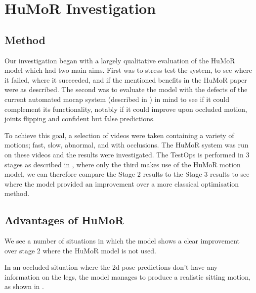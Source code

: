 \section{HuMoR Investigation}
\label{sec:humor_investigation}

\subsection{Method}
Our investigation began with a largely qualitative evaluation of the HuMoR model which had two main aims.  First was to stress test the system, to see where it failed, where it succeeded, and if the mentioned benefits in the HuMoR paper \cite{humor} were as described.  The second was to evaluate the model with the defects of the current automated mocap system (described in ) in mind to see if it could complement its functionality, notably if it could improve upon occluded motion, joints flipping and confident but false predictions.

To achieve this goal, a selection of videos were taken containing a variety of motions; fast, slow, abnormal, and with occlusions. The HuMoR system was run on these videos and the results were investigated. The TestOps is performed in 3 stages as described in , where only the third makes use of the HuMoR motion model, we can therefore compare the Stage 2 results to the Stage 3 results to see where the model provided an improvement over a more classical optimisation method.

\subsection{Advantages of HuMoR}
We see a number of situations in which the model shows a clear improvement over stage 2 where the HuMoR model is not used.

In an occluded situation where the 2d pose predictions don't have any information on the legs, the model manages to produce a realistic sitting motion, as shown in .

